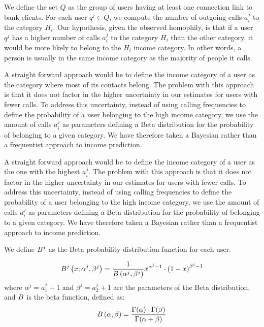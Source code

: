 We define the set $Q$ as the group of users having at least one connection link to bank clients. For each user $q^j \in Q$, we compute the number of outgoing calls $a^j_i$ to the category $H_i$. Our hypothesis, given the observed homophily, is that if a user $q^j$ has a higher number of calls $a^j_i$ to the category $H_i$ than the other category, it would be more likely to belong to the $H_i$ income category. In other words, a person is usually in the same income category as the majority of people it calls.

A straight forward approach would be to define the income category of a user as the category where most of its contacts belong. The problem with this approach is that it does not factor in the higher uncertainty in our estimates for users with fewer calls. To address this uncertainty, instead of using calling frequencies to define the probability of a user belonging to the high income category, we use the amount of calls $a^j_i$  as parameters defining a Beta distribution for the probability of belonging to a given category. We have therefore taken a Bayesian rather than a frequentist approach to income prediction.

A straight forward approach would be to define the income category of a user as the one with the highest $a^j_i$. The problem with this approach is that it does not factor in the higher uncertainty in our estimates for users with fewer calls. To address this uncertainty, instead of using calling frequencies to define the probability of a user belonging to the high income category, we use the amount of calls $a^j_i$  as parameters defining a Beta distribution for the probability of belonging to a given category. We have therefore taken a Bayesian rather than a frequentist approach to income prediction. 

We define \(B^j\) as the Beta probability distribution function for each user.

\begin{equation}
	B^j \left( x; \alpha^j, \beta^j \right) = \frac{1}{B \left( \alpha^j, \beta^j \right)} x^{\alpha^j - 1} \cdot {\left( 1 - x \right)}^{\beta^j - 1}
\label{Beta}
\end{equation}
where $\alpha^j = a^j_1 +1$ and $\beta^j = a^j_2 +1$ are the parameters of the Beta distribution,
and $B$ is the beta function, defined as:
\begin{equation}
B \left( \alpha, \beta \right) =
\frac{\Gamma \! \left( \alpha \right) \cdot \Gamma \! \left( \beta \right)}
{\Gamma \! \left( \alpha + \beta \right)}
\label{Beta}
\end{equation}


